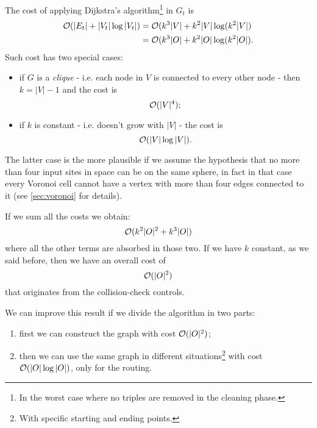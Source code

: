 \documentclass[dissertation.tex]{subfiles}
\begin{document}
The cost of applying Dijkstra's algorithm\footnote{In the worst case
  where no triples are removed in the cleaning phase.} in $G_t$ is \cite{bondy}\cite{lavalle}
\newcommand{\eqCostDijkstraTriples}{\ensuremath{\bigO(k^3|\obsSet|+k^2|\obsSet|\log(k^2|\obsSet|)}}
\begin{equation}
  \label{eq:costDijkstraTriples}
  \begin{split}
    \bigO(|E_t|+|V_t|\log |V_t|) &= \bigO(k^3|V|+k^2|V|\log(k^2|V|)\\
    &= \eqCostDijkstraTriples.
  \end{split}
\end{equation}
Such cost has two special cases:
\begin{itemize}
\item if $G$ is a \emph{clique} - i.e. each
  node in $V$ is connected to every other node \cite{bondy} - then
  $k=|V|-1$ and the cost is
  \begin{equation*}
    \mathcal{O}(|V|^4);
  \end{equation*}
\item if $k$ is constant - i.e. doesn't grow with $|V|$ - the
  cost is
  \begin{equation*}
    \mathcal{O}(|V|\log|V|).
  \end{equation*}
\end{itemize}
The latter case is the more plausible if we assume the hypothesis that
no more than four input sites in space can be on the
same sphere, in fact in that case
every Voronoi cell cannot have a vertex with more than four edges
connected to it (see \cref{sec:voronoi} for details).

If we sum all the costs we obtain:
\newcommand{\eqCostTotalOne}{\ensuremath{\bigO(k^2|\obsSet|^2+k^3|\obsSet|)}}
\begin{equation}\label{eq:costTotalOne}
  \eqCostTotalOne
\end{equation}
where all the other terms are absorbed in those two. If we have $k$
constant, as we said before, then we have an overall cost of
\newcommand{\eqCostTotalOneK}{\ensuremath{\bigO(|\obsSet|^2)}}
\begin{equation}\label{eq:costTotalOneK}
  \eqCostTotalOneK
\end{equation}
that originates from the collision-check controls.

We can improve
this result if we divide the algorithm in two parts:
\begin{enumerate}
\item first we 
  can construct the graph with cost $\mathcal{O}(|O|^2)$;
\item then we can
  use the same graph in different situations\footnote{With specific starting
    and ending points.} with cost $\mathcal{O}(|O|\log |O|)$, only for the
  routing.
\end{enumerate}
\end{document}
